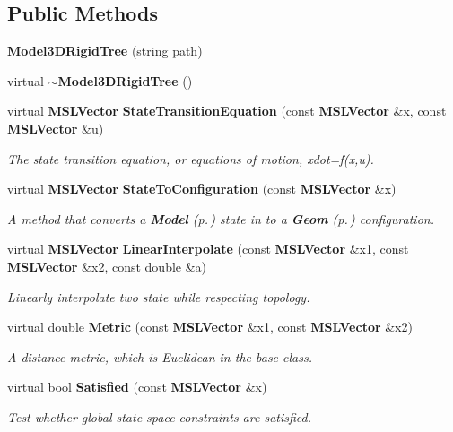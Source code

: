 \subsection*{Public Methods}
\begin{CompactItemize}
\item 
{\bf Model3DRigid\-Tree} (string path)
\item 
virtual {\bf $\sim$Model3DRigid\-Tree} ()
\item 
virtual {\bf MSLVector} {\bf State\-Transition\-Equation} (const {\bf MSLVector} \&x, const {\bf MSLVector} \&u)
\begin{CompactList}\small\item\em The state transition equation, or equations of motion, xdot=f(x,u).\item\end{CompactList}\item 
virtual {\bf MSLVector} {\bf State\-To\-Configuration} (const {\bf MSLVector} \&x)
\begin{CompactList}\small\item\em A method that converts a {\bf Model} {\rm (p.\,\pageref{classModel})} state in to a {\bf Geom} {\rm (p.\,\pageref{classGeom})} configuration.\item\end{CompactList}\item 
virtual {\bf MSLVector} {\bf Linear\-Interpolate} (const {\bf MSLVector} \&x1, const {\bf MSLVector} \&x2, const double \&a)
\begin{CompactList}\small\item\em Linearly interpolate two state while respecting topology.\item\end{CompactList}\item 
virtual double {\bf Metric} (const {\bf MSLVector} \&x1, const {\bf MSLVector} \&x2)
\begin{CompactList}\small\item\em A distance metric, which is Euclidean in the base class.\item\end{CompactList}\item 
virtual bool {\bf Satisfied} (const {\bf MSLVector} \&x)
\begin{CompactList}\small\item\em Test whether global state-space constraints are satisfied.\item\end{CompactList}\end{CompactItemize}

